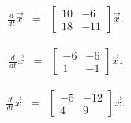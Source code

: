 \begin{problem}
\begin{subproblem}
        \vfill
        \clearpage


      \item 
        \begin{eqnarray}
          \frac{d}{dt} \vec{x} & = & 
          \left[ \begin{array}{rr}
              10 &  -6 \\
              18 & -11
            \end{array} \right] \vec{x}.
        \end{eqnarray}

        \vfill
        \clearpage

    \item 
        \begin{eqnarray}
          \frac{d}{dt} \vec{x} & = & 
          \left[ \begin{array}{rr}
               -6 & -6 \\
                1 & -1
            \end{array} \right] \vec{x}.
        \end{eqnarray}

        \vfill
        \clearpage


      \item 
        \begin{eqnarray}
          \frac{d}{dt} \vec{x} & = & 
          \left[ \begin{array}{rr}
              -5 &  -12 \\
               4 &    9
            \end{array} \right] \vec{x}.
        \end{eqnarray}

        \vfill


    \end{subproblem}


\end{problem}

